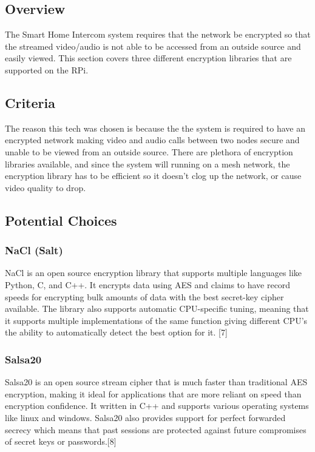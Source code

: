 \documentclass[onecolumn, draftclsnofoot,10pt, compsoc]{IEEEtran}
\begin{document}
\subsection{Overview}
 The Smart Home Intercom system requires that the network be encrypted so that the streamed video/audio is not able to be accessed from an outside source and easily viewed. 
 This section covers three different encryption libraries that are supported on the RPi.

\subsection{Criteria}
 The reason this tech was chosen is because the the system is required to have an encrypted network making video and audio calls between two nodes secure and unable to be viewed from an outside source. There are plethora of encryption libraries available, and since the system will running on a mesh network, the encryption library has to be efficient so it doesn't clog up the network, or cause video quality to drop.

\subsection{Potential Choices}
\subsubsection{NaCl (Salt)}
NaCl is an open source encryption library that supports multiple languages like Python, C, and C++. It encrypts data using AES and claims to have record speeds for encrypting bulk amounts of data with the best secret-key cipher available. The library also supports automatic CPU-specific tuning, meaning that it supports multiple implementations of the same function giving different CPU's the ability to automatically detect the best option for it. [7]



\subsubsection{Salsa20}
Salsa20 is an open source stream cipher that is much faster than traditional AES encryption, making it ideal for applications that are more reliant on speed than encryption confidence. It written in C++ and supports various operating systems like linux and windows. Salsa20 also provides support for perfect forwarded secrecy which means that past sessions are protected against future compromises of secret keys or passwords.[8]
\end{document}
